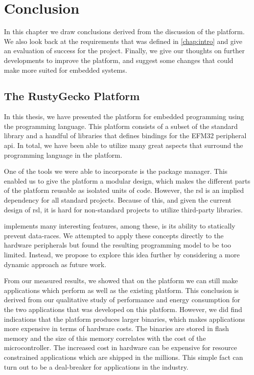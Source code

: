 
\chapter{Conclusion}
\label{chap:conclusion}

In this chapter we draw conclusions derived from the discussion of the {\rg} platform.
We also look back at the requirements that was defined in \autoref{chap:intro} and give an evaluation of success for the project.
Finally, we give our thoughts on further developments to improve the {\rg} platform, and suggest some changes that could make {\rust} more suited for embedded systems.

\section{The RustyGecko Platform}

In this thesis, we have presented the {\rg} platform for embedded programming using the {\rust} programming language.
This platform consists of a subset of the {\rust} standard library and a handful of libraries that defines bindings for the EFM32 peripheral \gls{api}.
In total, we have been able to utilize many great aspects that surround the {\rust} programming language in the {\rg} platform.

One of the tools we were able to incorporate is the {\cargo} package manager.
This enabled us to give the {\rg} platform a modular design, which makes the different parts of the platform reusable as isolated units of code.
However, the \gls{rsl} is an implied dependency for all standard {\rust} projects.
Because of this, and given the current design of \gls{rsl}, it is hard for non-standard projects to utilize third-party libraries.

{\rust} implements many interesting features, among these, is its ability to statically prevent data-races.
We attempted to apply these concepts directly to the hardware peripherals but found the resulting programming model to be too limited.
Instead, we propose to explore this idea further by considering a more dynamic approach as future work.

From our measured results, we showed that on the {\rg} platform we can still make applications which perform as well as the existing {\C} platform.
This conclusion is derived from our qualitative study of performance and energy consumption for the two applications that was developed on this platform.
However, we did find indications that the platform produces larger binaries, which makes {\rust} applications more expensive in terms of hardware costs.
The binaries are stored in flash memory and the size of this memory correlates with the cost of the microcontroller.
The increased cost in hardware can be expensive for resource constrained applications which are shipped in the millions.
This simple fact can turn out to be a deal-breaker for applications in the industry.

